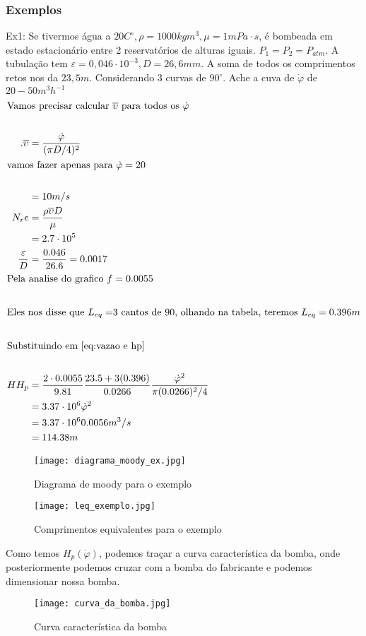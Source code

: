 \subsubsection{Exemplos}
Ex1: Se tivermos água a \(20  C^\circ, \rho=1000kgm^{3},\mu=1mPa\cdot s\), é bombeada em estado
estacionário entre 2 reservatórios de alturas iguais. \(P_1=P_2=P_{atm}\). A tubulação tem
\(\varepsilon=0,046 \cdot 10^ {-3}, D=26,6 mm\). A soma de todos os comprimentos retos nos da
\(23,5m\). Considerando 3 curvas de \(90 ^{\circ}\). Ache a cuva de \(\dot{\varphi}\) de \(20-50m^3
h^{-1}\)
\begin{align}
    \intertext{Vamos precisar calcular \(\overline{\upsilon}\) para todos os \(\dot{\varphi}\)}\notag\\.
    \overline{\upsilon}&=\frac{\dot{\varphi}}{(\pi D/4)^2}\\
    \intertext{vamos fazer apenas para \(\dot{\varphi}=20\)}\notag\\
    &=10 m/s\\
    N_re&=\frac{\rho\overline{\upsilon}D}{\mu}\\
    &=2.7\cdot10^5\\
    \frac{\varepsilon}{D}&=\frac{0.046}{26.6}=0.0017\\
    \intertext{Pela analise do grafico \(f=0.0055\)}\notag\\
    \intertext{Eles nos disse que \(L_{eq}=\)3 cantos de 90, olhando na tabela, teremos \(L_{eq}=0.396 m\)}\notag\\
    \intertext{Substituindo em \eqref{eq:vazao e hp}}\notag\\H
    H_p&=\frac{2 \cdot 0.0055}{9.81}\frac{23.5+3(0.396)}{0.0266}\frac{\dot{\varphi}^2}{\pi (0.0266)^2/4}\\
    &=3.37 \cdot 10^6 \dot{\varphi}^2\\
    &=3.37 \cdot 10^6 0.0056 m^3/s\\
    &=114.38 m
\end{align}
\begin{figure}[H]
    \centering
    \texttt{[image: diagrama\_moody\_ex.jpg]}
    \caption{Diagrama de moody para o exemplo}
    \label{fig: diagrama_moody_ex}
\end{figure}
\begin{figure}[H]
    \centering
    \texttt{[image: leq\_exemplo.jpg]}
    \caption{Comprimentos equivalentes para o exemplo}
    \label{fig: leq_exemplo}
\end{figure}
Como temos \(H_p(\dot{\varphi})\), podemos traçar a curva característica da bomba, onde
posteriormente podemos cruzar com a bomba do fabricante e podemos dimensionar nossa bomba.
\begin{figure}[H]
    \centering
    \texttt{[image: curva\_da\_bomba.jpg]}
    \caption{Curva característica da bomba}
    \label{fig:curva_da_bomba}
\end{figure}

